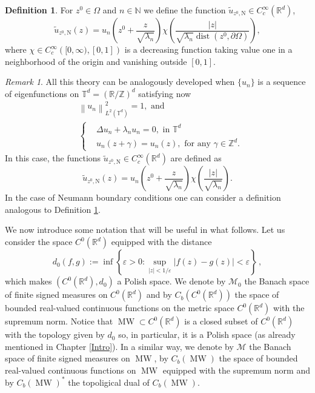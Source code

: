 \documentclass{amsart}
\theoremstyle{definition}
\newtheorem{definition}[theorem]{Definition}
\theoremstyle{remark}
\newtheorem{remark}[theorem]{Remark}
\newcommand{\ep}{\varepsilon}
\newcommand{\ga}{\gamma}
\def\RR{\mathbb{R}}
\DeclareMathOperator\dist{dist} \DeclareMathOperator\diam{diam}
\numberwithin{equation}{section}
\theoremstyle{definition}
\theoremstyle{remark}
\def\RR{\mathbb{R}}
\DeclareMathOperator\MW{MW}
\newcommand\dz{d_{0}}
\begin{document}
\begin{definition}\label{funcion}
	For $z^0\in\Omega$ and $n\in\mathbb{N}$ we define the function $\tilde{u}_{z^0,\mathrm{N}}\in C^\infty_c(\mathbb{R}^d)$,
	\begin{equation}
		\tilde{u}_{z^0,\mathrm{N}}(z)=u_n\left(z^0+\frac{z}{\sqrt{\lambda_n}}\right)\chi\left(\frac{|z|}{\sqrt{\lambda_{n}}\dist(z^0,\partial\Omega)}\right),
	\end{equation}where $\chi\in C^\infty_c\left([0,\infty),[0,1]\right)$ is a decreasing function taking value one in a neighborhood of the origin and vanishing outside $[0,1]$.
\end{definition}
\begin{remark}
	All this theory can be analogously developed when $\{u_n\}$ is a sequence of eigenfunctions on $\mathbb{T}^d=(\mathbb R/\mathbb Z)^d$ satisfying now \begin{equation}
		\begin{aligned}
			&\left\|u_n\right\|_{L^2(\mathbb T^d)}^2=1,\text{ and }\\
			&\left\{\begin{aligned}
				&\Delta u_n+\lambda_{n}u_n=0, \text{ in }\mathbb{T}^d\\
				&u_n\left(z+\ga\right)=u_n(z),\text{ for any } \ga\in\mathbb{Z}^d.
			\end{aligned}\right.
		\end{aligned}
	\end{equation}
	 In this case, the functions $ \tilde{u}_{z^0,\mathrm{N}}\in C^\infty_c(\mathbb{R}^d)$ are defined as \begin{equation}
		\tilde{u}_{z^0,\mathrm{N}}(z)=u_n\left(z^0+\frac{z}{\sqrt{\lambda_n}}\right)\chi\left(\frac{|z|}{\sqrt{\lambda_{n}}}\right).
	\end{equation}
	In the case of Neumann boundary conditions one can consider a definition analogous to Definition \ref{funcion}.
\end{remark}
We now introduce some notation that will be useful in what follows. Let us consider the space $C^0\left(\RR^d\right)$ equipped with the distance \begin{equation}
	\dz(f,g):=\inf\left\{\ep>0: \sup_{|z|<1/\ep}|f(z)-g(z)|<\ep  \right\}\,,\end{equation}
	which makes $\left(C^0\left(\RR^d\right),\dz\right)$ a Polish space. We denote by $\mathcal{M}_0$ the Banach space of finite signed measures on $C^0\left(\RR^d\right)$ and by $C_b\left(C^0\left(\RR^d\right)\right)$ the space of bounded real-valued continuous functions on the metric space $C^0\left(\RR^d\right)$ with the supremum norm. Notice that $\MW\subset C^0\left(\RR^d\right)$ is a closed subset of $C^0\left(\RR^d\right)$ with the topology given by $\dz$ so, in particular, it is a Polish space (as already mentioned in Chapter \ref{Intro}). In a similar way, we denote by $\mathcal{M}$ the Banach space of finite signed measures on $\MW$, by $C_b\left(\MW\right)$ the space of bounded real-valued continuous functions on $\MW$ equipped with the supremum norm and by $C_b\left(\MW\right)^*$ the topoligical dual of $C_b\left(\MW\right)$. 
	
\end{document}
